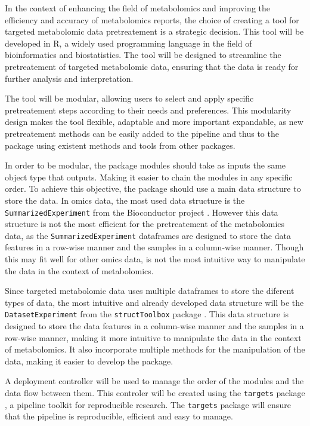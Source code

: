 \documentclass[ENG, BIB]{TFUOC}%
\begin{document}
In the context of enhancing the field of metabolomics and improving the efficiency and accuracy of metabolomics reports, the choice of creating a tool for targeted metabolomic data pretreatement is a strategic decision. This tool will be developed in R, a widely used programming language in the field of bioinformatics and biostatistics. The tool will be designed to streamline the pretreatement of targeted metabolomic data, ensuring that the data is ready for further analysis and interpretation. 

The tool will be modular, allowing users to select and apply specific pretreatement steps according to their needs and preferences. This modularity design makes the tool flexible, adaptable and more important expandable, as new pretreatement methods can be easily added to the pipeline and thus to the package using existent methods and tools from other packages.

In order to be modular, the package modules should take as inputs the same object type that outputs. Making it easier to chain the modules in any specific order. To achieve this objective, the package should use a main data structure to store the data. In omics data, the most used data structure is the \texttt{SummarizedExperiment} from the Bioconductor project \cite{R-SummarizedExperiment}. However this data structure is not the most efficient for the pretreatement of the metabolomics data, as the \texttt{SummarizedExperiment} dataframes are designed to store the data features in a row-wise manner and the samples in a column-wise manner. Though this may fit well for other omics data, is not the most intuitive way to manipulate the data in the context of metabolomics.

Since targeted metabolomic data uses multiple dataframes to store the diferent types of data, the most intuitive and already developed data structure will be the \texttt{DatasetExperiment} from the \texttt{structToolbox} package \cite{structToolbox2020}. This data structure is designed to store the data features in a column-wise manner and the samples in a row-wise manner, making it more intuitive to manipulate the data in the context of metabolomics. It also incorporate multiple methods for the manipulation of the data, making it easier to develop the package. 

A deployment controller will be used to manage the order of the modules and the data flow between them. This controler will be created using the \texttt{targets} package \cite{targets2021}, a pipeline toolkit for reproducible research. The \texttt{targets} package will ensure that the pipeline is reproducible, efficient and easy to manage.
\end{document}
